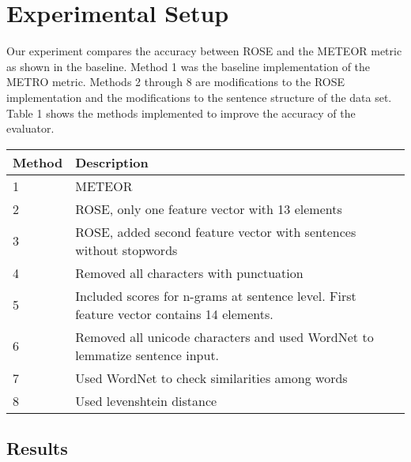 \documentclass[11pt,letterpaper]{article}
\begin{document}
\section{Experimental Setup}

Our experiment compares the accuracy between ROSE and the METEOR metric as shown in the baseline. Method 1 was the baseline implementation of the METRO metric. Methods 2 through 8 are modifications to the ROSE implementation  \cite{song2011regression} and the modifications to the sentence structure of the data set. 
Table 1 shows the methods implemented to improve the accuracy of the evaluator.
\begin{center}
	\begin{tabular}{| l | p{6.3cm} |}
	\hline
	Method & Description \\ \hline
	1 & METEOR \\ \hline
	2 & ROSE, only one feature vector with 13 elements \\ \hline
	3 & ROSE, added second feature vector with sentences without stopwords \\ \hline
	4 & Removed all characters with punctuation \\ \hline
	5 & Included scores for n-grams at sentence level. First feature vector contains 14 elements.  \\ \hline
	6 & Removed all unicode characters and used WordNet to lemmatize sentence input. \\ \hline
	7 & Used WordNet to check similarities among words \\ \hline
	8 & Used levenshtein distance \\ \hline
	\end{tabular}
\end{center}
	

\subsection{Results}
\end{document}

